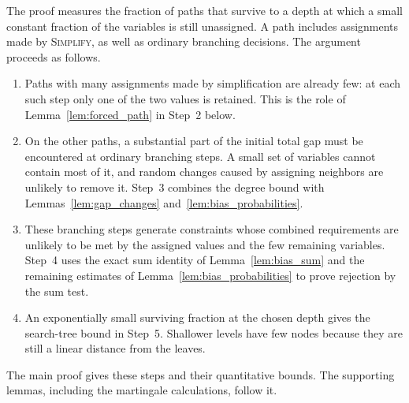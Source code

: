 \documentclass[11pt,a4paper]{article}
\theoremstyle{definition}
\theoremstyle{remark}
\begin{document}
The proof measures the fraction of paths that survive to a depth at which
a small constant fraction of the variables is still unassigned. A path
includes assignments made by \textnormal{\textsc{Simplify}}, as well as
ordinary branching decisions. The argument proceeds as follows.
\begin{enumerate}
\item Paths with many assignments made by simplification are already few:
at each such step only one of the two values is retained. This is the
role of Lemma~\ref{lem:forced_path} in Step~2 below.
\item On the other paths, a substantial part of the initial total gap
must be encountered at ordinary branching steps. A small set of variables
cannot contain most of it, and random changes caused by assigning
neighbors are unlikely to remove it. Step~3 combines the degree bound
with Lemmas~\ref{lem:gap_changes} and~\ref{lem:bias_probabilities}.
\item These branching steps generate constraints whose combined
requirements are unlikely to be met by the assigned values and the few
remaining variables. Step~4 uses the exact sum identity of
Lemma~\ref{lem:bias_sum} and the remaining estimates of
Lemma~\ref{lem:bias_probabilities} to prove rejection by the sum test.
\item An exponentially small surviving fraction at the chosen depth
gives the search-tree bound in Step~5. Shallower levels have few nodes
because they are still a linear distance from the leaves.
\end{enumerate}
The main proof gives these steps and their quantitative bounds. The
supporting lemmas, including the martingale calculations, follow it.
\end{document}

